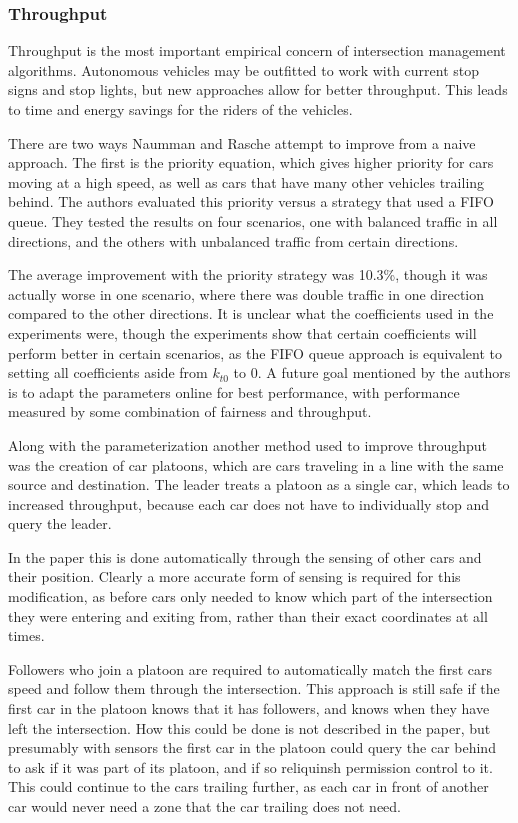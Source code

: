\documentclass[12pt]{article}
\begin{document}
\subsubsection{Throughput}
Throughput is the most important empirical concern of intersection management algorithms. Autonomous vehicles may be outfitted to work with current stop signs and stop lights, but new approaches allow for better throughput. This leads to time and energy savings for the riders of the vehicles.\par
There are two ways Naumman and Rasche attempt to improve from a naive approach. The first is the priority equation, which gives higher priority for cars moving at a high speed, as well as cars that have many other vehicles trailing behind. The authors evaluated this priority versus a strategy that used a FIFO queue. They tested the results on four scenarios, one with balanced traffic in all directions, and the others with unbalanced traffic from certain directions. \par
The average improvement with the priority strategy was 10.3\%, though it was actually worse in one scenario, where there was double traffic in one direction compared to the other directions. It is unclear what the coefficients used in the experiments were, though the experiments show that certain coefficients will perform better in certain scenarios, as the FIFO queue approach is equivalent to setting all coefficients aside from $k_{t0}$ to 0. A future goal mentioned by the authors is to adapt the parameters online for best performance, with performance measured by some combination of fairness and throughput.\par
Along with the parameterization another method used to improve throughput was the creation of car platoons, which are cars traveling in a line with the same source and destination. The leader treats a platoon as a single car, which leads to increased throughput, because each car does not have to individually stop and query the leader. \par
In the paper this is done automatically through the sensing of other cars and their position. Clearly a more accurate form of sensing is required for this modification, as before cars only needed to know which part of the intersection they were entering and exiting from, rather than their exact coordinates at all times. \par
Followers who join a platoon are required to automatically match the first cars speed and follow them through the intersection. This approach is still safe if the first car in the platoon knows that it has followers, and knows when they have left the intersection. How this could be done is not described in the paper, but presumably with sensors the first car in the platoon could query the car behind to ask if it was part of its platoon, and if so reliquinsh permission control to it. This could continue to the cars trailing further, as each car in front of another car would never need a zone that the car trailing does not need.\par
\end{document}
